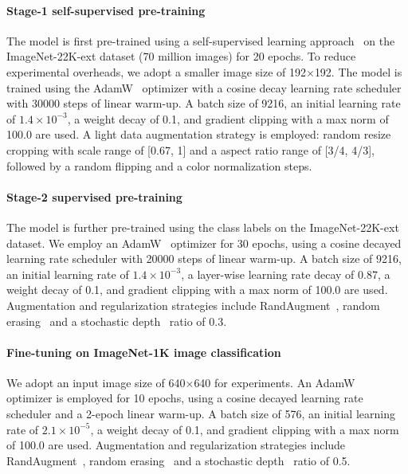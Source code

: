 \documentclass[10pt,twocolumn,letterpaper]{article}
\begin{document}
\paragraph{Stage-1 self-supervised pre-training}
The model is first pre-trained using a self-supervised learning approach~\cite{anonymous} on the ImageNet-22K-ext dataset (70 million images) for 20 epochs. To reduce experimental overheads, we adopt a smaller image size of 192$\times$192. The model is trained using the AdamW~\cite{loshchilov2017decoupled} optimizer with a cosine decay learning rate scheduler with 30000 steps of linear warm-up. A batch size of 9216, an initial learning rate of $1.4\times10^{-3}$, a weight decay of 0.1, and gradient clipping with a max norm of 100.0 are used. A light data augmentation strategy is employed: random resize cropping with scale range of [0.67, 1] and a aspect ratio range of [3/4, 4/3], followed by a random flipping and a color normalization steps.

\paragraph{Stage-2 supervised pre-training}
The model is further pre-trained using the class labels on the ImageNet-22K-ext dataset. We employ an AdamW~\cite{loshchilov2017decoupled} optimizer for 30 epochs, using a cosine decayed learning rate scheduler with 20000 steps of linear warm-up. A batch size of 9216, an initial learning rate of $1.4\times10^{-3}$, a layer-wise learning rate decay of 0.87, a weight decay of 0.1, and gradient clipping with a max norm of 100.0 are used. Augmentation and regularization strategies include RandAugment~\cite{cubuk2020randaugment}, random erasing~\cite{zhong2020random} and a stochastic depth~\cite{huang2016deep} ratio of 0.3.

\paragraph{Fine-tuning on ImageNet-1K image classification}
We adopt an input image size of 640$\times$640 for experiments. An AdamW~\cite{loshchilov2017decoupled} optimizer is employed for 10 epochs, using a cosine decayed learning rate scheduler and a 2-epoch linear warm-up. A batch size of 576, an initial learning rate of $2.1\times10^{-5}$, a weight decay of 0.1, and gradient clipping with a max norm of 100.0 are used. Augmentation and regularization strategies include RandAugment~\cite{cubuk2020randaugment}, random erasing~\cite{zhong2020random} and a stochastic depth~\cite{huang2016deep} ratio of 0.5.
\end{document}
